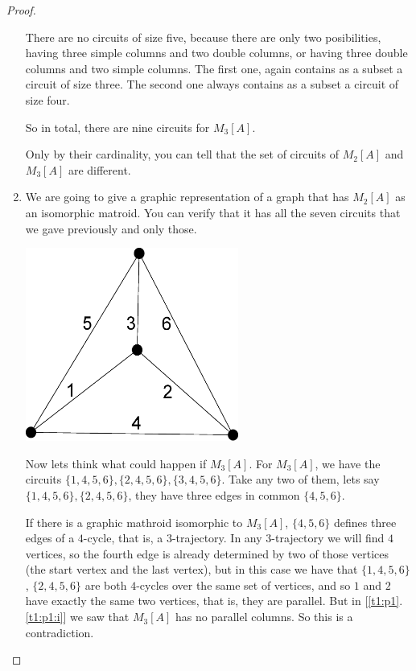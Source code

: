 \begin{proof}
\begin{enumerate}[label=(\roman*)]
            There are no circuits of size five, because there are only two posibilities, having three simple columns and two double columns, 
            or having three double  columns and two simple columns. The first one, again contains as a subset a circuit of size three.
            The second one always contains as a subset a circuit of size four.\pn
            
            So in total, there are nine circuits for $M_3[A]$.\pn
                        
            Only by their cardinality, you can tell that the set of circuits of $M_2[A]$ and $M_3[A]$ are different.
            
        \item\label{t1:p1:ii}
            We are going to give a graphic representation of a graph that has $M_2[A]$ as an isomorphic matroid. You can
            verify that it has all the seven circuits that we gave previously and only those.\pn
            \begin{center}
                \includegraphics[width=7cm]{Test1/Problem1/tetrahedron.eps}
            \end{center}
            
            Now lets think what could happen if $M_3[A]$. For $M_3[A]$, we have the circuits 
            $\{1, 4, 5, 6\}, \{2, 4, 5, 6\}, \{3, 4, 5, 6\}$. Take any two of them, lets say
            $\{1, 4, 5, 6\}, \{2, 4, 5, 6\}$, they have three edges in common $\{4,5,6\}$. \pn
            
            If there is a graphic mathroid isomorphic to $M_3[A]$, $\{4,5,6\}$ defines three edges of a 
            $4$-cycle, that is, a $3$-trajectory. In any $3$-trajectory we will find $4$ vertices, so the fourth 
            edge is already determined by two of those vertices (the start vertex and the last vertex), but in this case 
            we have that $\{1, 4, 5, 6\}$, $\{2, 4, 5, 6\}$ are both $4$-cycles over the same set of vertices, 
            and so $1$ and $2$ have exactly the same two vertices, that is, they are parallel. But in [\ref{t1:p1}.\ref{t1:p1:i}]
            we saw that $M_3[A]$ has no parallel columns. So this is a contradiction.
        \end{enumerate}
\end{proof}